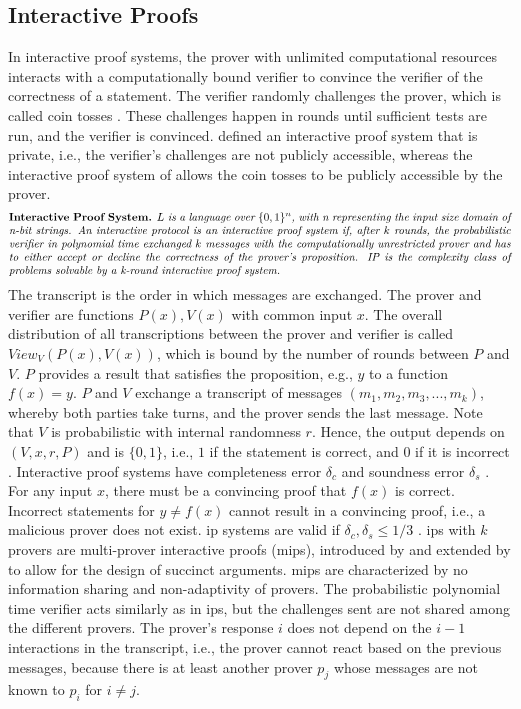 \subsection{Interactive Proofs}
In interactive proof systems, the prover with unlimited computational resources interacts with a computationally bound verifier to convince the verifier of the correctness of a statement. The verifier randomly challenges the prover, which is called coin tosses \citep{GoldwasserCoinTosses}. These challenges happen in rounds until sufficient tests are run, and the verifier is convinced. \citet{GoldwasserIPs} defined an interactive proof system that is private, i.e., the verifier's challenges are not publicly accessible, whereas the interactive proof system of \citet{BabaiIPs} allows the coin tosses to be publicly accessible by the prover.
\begin{align*}
    \text{\parbox{450pt}{\textbf{Interactive Proof System.} \textit{\(L\) is a language over \(\{0,1\}^n\), with n representing the input size domain of n-bit strings. An interactive protocol is an interactive proof system if, after \(k\) rounds, the probabilistic verifier in polynomial time exchanged \(k\) messages with the computationally unrestricted prover and has to either accept or decline the correctness of the prover's proposition. IP is the complexity class of problems solvable by a k-round interactive proof system.}}}
\end{align*}
The transcript is the order in which messages are exchanged. The prover and verifier are functions \(P(x), V(x)\) with common input \(x\). The overall distribution of all transcriptions between the prover and verifier is called \(View_V(P(x), V(x))\), which is bound by the number of rounds between \(P\) and \(V\). \(P\) provides a result that satisfies the proposition, e.g., \(y\) to a function \(f(x) = y\). \(P\) and \(V\) exchange a transcript of messages \((m_1, m_2, m_3, ..., m_k)\), whereby both parties take turns, and the prover sends the last message. Note that \(V\) is probabilistic with internal randomness \(r\). Hence, the output depends on \((V, x, r, P)\) and is \(\{0,1\}\), i.e., \(1\) if the statement is correct, and \(0\) if it is incorrect \citep{GoldwasserIPs, BabaiIPs}. Interactive proof systems have completeness error \(\delta_c\) and soundness error \(\delta_s\) . For any input \(x\), there must be a convincing proof that \(f(x)\) is correct. Incorrect statements for \(y \neq f(x)\) cannot result in a convincing proof, i.e., a malicious prover does not exist. \acrshort{ip} systems are valid if \(\delta_c, \delta_s \leq 1/3\) \citep{Thaler}. \acrshort{ip}s with \(k\) provers are multi-prover interactive proofs (\acrshort{mip}s), introduced by \citet{MIPsBen} and extended by \citet{MIPsSetty} to allow for the design of succinct arguments. \acrshort{mip}s are characterized by no information sharing and non-adaptivity of provers. The probabilistic polynomial time verifier acts similarly as in \acrshort{ip}s, but the challenges sent are not shared among the different provers. The prover's response \(i\) does not depend on the \(i-1\) interactions in the transcript, i.e., the prover cannot react based on the previous messages, because there is at least another prover \(p_j\) whose messages are not known to \(p_i\) for \(i\neq j\).

